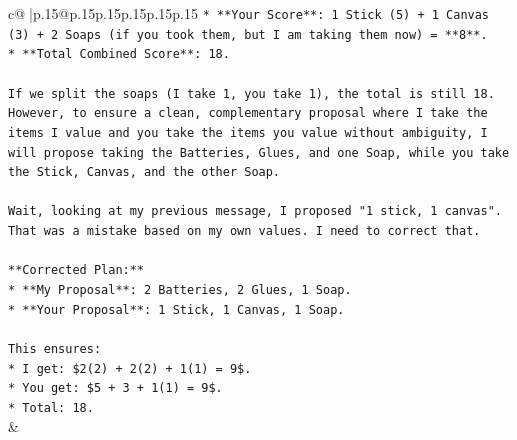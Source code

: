 \documentclass{article}
\begin{document}
{\begin{supertabular}{c@{$\;$}|p{.15\linewidth}@{}p{.15\linewidth}p{.15\linewidth}p{.15\linewidth}p{.15\linewidth}p{.15\linewidth}}
{{{\texttt{*   **Your Score**: 1 Stick (5) + 1 Canvas (3) + 2 Soaps (if you took them, but I am taking them now) = **8**.} \\
\texttt{*   **Total Combined Score**: 18.} \\
\\ 
\texttt{If we split the soaps (I take 1, you take 1), the total is still 18. However, to ensure a clean, complementary proposal where I take the items I value and you take the items you value without ambiguity, I will propose taking the Batteries, Glues, and one Soap, while you take the Stick, Canvas, and the other Soap.} \\
\\ 
\texttt{Wait, looking at my previous message, I proposed "1 stick, 1 canvas". That was a mistake based on my own values. I need to correct that.} \\
\\ 
\texttt{**Corrected Plan:**} \\
\texttt{*   **My Proposal**: 2 Batteries, 2 Glues, 1 Soap.} \\
\texttt{*   **Your Proposal**: 1 Stick, 1 Canvas, 1 Soap.} \\
\\ 
\texttt{This ensures:} \\
\texttt{*   I get: \$2(2) + 2(2) + 1(1) = 9\$.} \\
\texttt{*   You get: \$5 + 3 + 1(1) = 9\$.} \\
\texttt{*   Total: 18.} \\
            }
        }
    }
    & \\ \\


\end{supertabular}}
\end{document}
